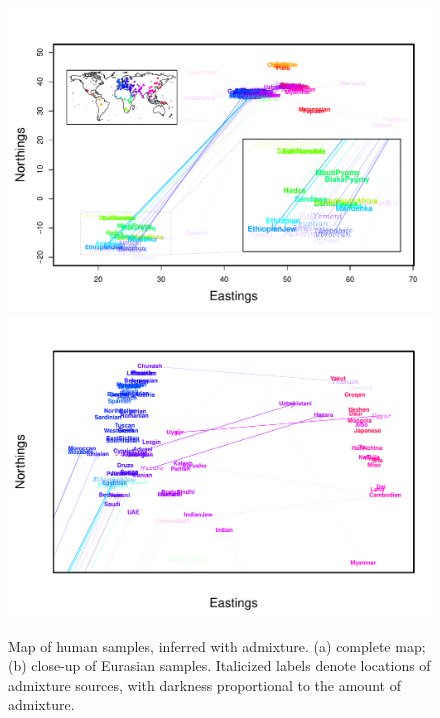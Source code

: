 \documentclass[10pt,letterpaper]{article}
\begin{document}
\begin{figure}
	\centering
			{\includegraphics[width=\textwidth,height=0.71\textwidth]{../figs/globetrotter/globe_Ad_map_AfricaInset.pdf}}
			{\includegraphics[width=\textwidth,height=0.71\textwidth]{../figs/globetrotter/eurasia_Ad_map_indproc.pdf}}
	\caption{
    Map of human samples, inferred with admixture. (a) complete map; (b) close-up of Eurasian samples.
    Italicized labels denote locations of admixture sources,
    with darkness proportional to the amount of admixture.
    }\label{sfig:globe_ad_maps}
\end{figure}
\end{document}
